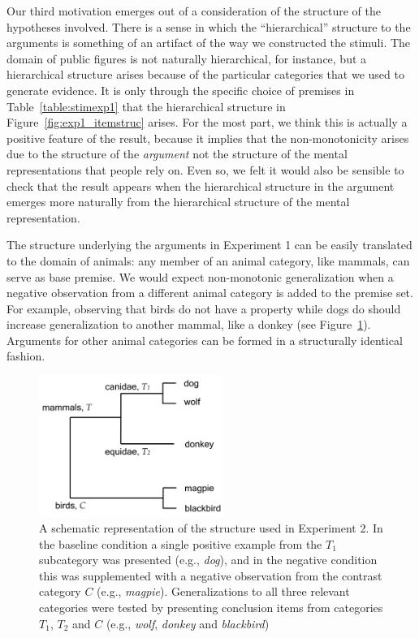 \documentclass[authoryear,11pt]{elsarticle}
\begin{document}
Our third motivation emerges out of a consideration of the structure of the hypotheses involved. There is a sense in which the ``hierarchical'' structure to the arguments is something of an artifact of the way we constructed the stimuli. The domain of public figures is not naturally hierarchical, for instance, but a hierarchical structure arises because of the particular categories that we used to generate evidence. It is only through the specific choice of premises in Table~\ref{table:stimexp1} that the hierarchical structure in Figure~\ref{fig:exp1_itemstruc} arises. For the most part, we think this is actually a positive feature of the result, because it implies that the non-monotonicity arises due to the structure of the {\it argument} not the structure of the mental representations that people rely on. Even so, we felt it would also be sensible to check that the result appears when the hierarchical structure in the argument emerges more naturally from the hierarchical structure of the mental representation.

The structure underlying the arguments in Experiment 1 can be easily translated to the domain of animals: any member of an animal category, like mammals, can serve as base premise. We would expect non-monotonic generalization when a negative observation from a different animal category is added to the premise set. For example, observing that birds do not have a property while dogs do should increase generalization to another mammal, like a donkey (see Figure~\ref{fig:exp2_itemstruc}). Arguments for other animal categories can be formed in a structurally identical fashion.

\begin{figure}[t!]
\begin{center}
\includegraphics[width=6cm]{fig/exp2_itemstruc2.png}
\end{center}
\vspace{-8mm}
\caption{\small A schematic representation of the structure used in Experiment 2. In the {\sc baseline} condition a single positive example from the $T_1$ subcategory was presented (e.g., {\it dog}), and in the {\sc negative} condition this was supplemented with a negative observation from the contrast category $C$ (e.g., {\it magpie}). Generalizations to all three relevant categories were tested by presenting conclusion items from categories $T_1$, $T_2$ and $C$ (e.g., {\it wolf}, {\it donkey} and {\it blackbird})}
\label{fig:exp2_itemstruc}
\end{figure}
\end{document}
